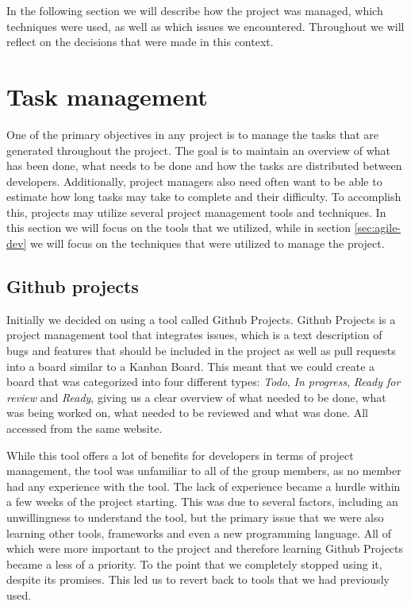 In the following section we will describe how the project was managed, which techniques were used, as well as which issues we encountered. Throughout we will reflect on the decisions that were made in this context.

\section{Task management}
One of the primary objectives in any project is to manage the tasks that are generated throughout the project. The goal is to maintain an overview of what has been done, what needs to be done and how the tasks are distributed between developers. Additionally, project managers also need often want to be able to estimate how long tasks may take to complete and their difficulty. To accomplish this, projects may utilize several project management tools and techniques. In this section we will focus on the tools that we utilized, while in section \ref{sec:agile-dev} we will focus on the techniques that were utilized to manage the project.

\subsection{Github projects}
Initially we decided on using a tool called Github Projects. Github Projects is a project management tool that integrates issues, which is a text description of bugs and features that should be included in the project as well as pull requests into a board similar to a Kanban Board. This meant that we could create a board that was categorized into four different types: \textit{Todo}, \textit{In progress}, \textit{Ready for review} and \textit{Ready}, giving us a clear overview of what needed to be done, what was being worked on, what needed to be reviewed and what was done. All accessed from the same website. 

While this tool offers a lot of benefits for developers in terms of project management, the tool was unfamiliar to all of the group members, as no member had any experience with the tool. The lack of experience became a hurdle within a few weeks of the project starting. This was due to several factors, including an unwillingness to understand the tool, but the primary issue that we were also learning other tools, frameworks and even a new programming language. All of which were more important to the project and therefore learning Github Projects became a less of a priority. To the point that we completely stopped using it, despite its promises.
This led us to revert back to tools that we had previously used.

